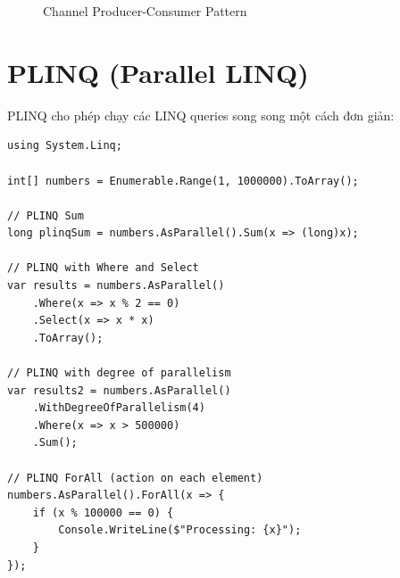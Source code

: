 \begin{figure}[H]
\centering
{}
\caption{Channel Producer-Consumer Pattern}
\label{fig:channel_pattern}
\end{figure}

\section{PLINQ (Parallel LINQ)}

PLINQ cho phép chạy các LINQ queries song song một cách đơn giản:

\begin{lstlisting}[style=csharpstyle, caption={PLINQ Examples}, label={lst:plinq_examples}]
using System.Linq;

int[] numbers = Enumerable.Range(1, 1000000).ToArray();

// PLINQ Sum
long plinqSum = numbers.AsParallel().Sum(x => (long)x);

// PLINQ with Where and Select
var results = numbers.AsParallel()
    .Where(x => x % 2 == 0)
    .Select(x => x * x)
    .ToArray();

// PLINQ with degree of parallelism
var results2 = numbers.AsParallel()
    .WithDegreeOfParallelism(4)
    .Where(x => x > 500000)
    .Sum();

// PLINQ ForAll (action on each element)
numbers.AsParallel().ForAll(x => {
    if (x % 100000 == 0) {
        Console.WriteLine($"Processing: {x}");
    }
});
\end{lstlisting}

